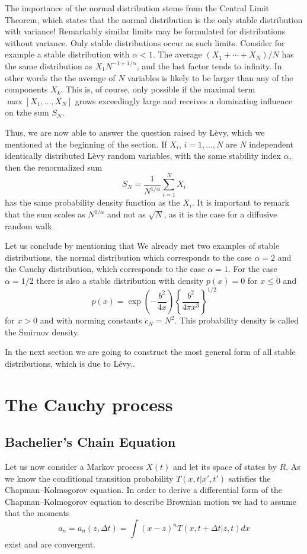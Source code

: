 The importance of the normal distribution stems from the Central Limit
Theorem, which states that the normal distribution is the only stable
distribution with variance! Remarkably similar limits may be formulated for
distributions without variance. Only stable distributions occur as such limits.
Consider for example a stable distribution with $\alpha <1$. The average
$(X_1 + \cdots + X_N)/N$ has the same distribution as $X_1 N^{-1 + 1/\alpha}$,
and the last factor tends to infinity. In other words the the average of $N$
variables is likely to be larger than any of the components $X_k$. This is, of
course, only possible if the maximal term $\max[X_1, \ldots, X_N]$ grows
exceedingly large and receives a dominating influence on tzhe sum $S_N$.

Thus, we are now able to answer the question raised by L\`evy, which we
mentioned at the beginning of the section. If $X_i$, $i=1, \ldots, N$ are
$N$ independent identically distributed L\`evy random variables, with the same
stability index $\alpha$, then the renormalized sum
\begin{displaymath}
S_N = \frac{1}{N^{1/\alpha}} \sum_{i=1}^N X_i  
\end{displaymath}
has the same probability density function as the $X_i$. It is important to
remark that the sum scales as $N^{1/\alpha}$ and not as $\sqrt{N}$, as it is
the case for a diffusive random  walk.

Let us conclude by mentioning that We already met two examples of 
stable distributions, the normal distribution
which corresponds to the case $\alpha = 2$
and the Cauchy distribution, which corresponds to the case
$\alpha =1$. For the case $\alpha =1/2$ there is also a stable distribution
with density $p(x)=0$ for $x \le 0$ and 
\begin{displaymath}
p(x) = \exp\left(- \frac{b^2}{4x} \right) 
           \left\{ \frac{b^2}{4 \pi x^3} \right\}^{1/2}
\end{displaymath}
for $x>0$ and with norming constants $c_N = N^2$. This probability density is
called the Smirnov density.

In the next section we are going to construct the
most general form of all stable distributions, which is due to L\'evy..


\section{The Cauchy process}
\subsection{Bachelier's Chain Equation}
Let us now consider a Markov process $X(t)$ and let its space of states by
$R$. As we know the conditional transition probability $T(x,t|x',t')$
satisfies the Chapman--Kolmogorov equation. In order to derive a differential
form of the Chapman--Kolmogorov equation to describe Brownian motion
we had to assume that the moments
\begin{displaymath}
  a_n = a_n(z,\Delta t) = \int (x-z)^n T(x,t+\Delta t|z,t) dx
\end{displaymath}
exist and are convergent. 

